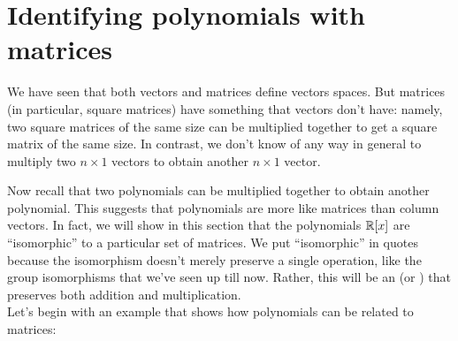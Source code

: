 \section{Identifying polynomials with matrices}\label{sec:ringIsoPolyMat}

We have seen that both vectors and matrices define vectors spaces.  But matrices (in particular, square matrices) have something that vectors don't have: namely, two square matrices of the same size can be multiplied together to get a square matrix of the same size.  In contrast, we don't know of any way in general to multiply two $n \times 1$ vectors to obtain another $n \times 1$ vector. 

Now recall that two polynomials can be multiplied together to obtain another polynomial. This suggests that polynomials are more like matrices than column vectors. In fact, we will show in this section that the polynomials $\mathbb{R}[x]$ are ``isomorphic'' to a particular set of matrices.  We put ``isomorphic'' in quotes because the isomorphism doesn't merely preserve a single operation, like the group isomorphisms  that we've seen up till now. Rather, this will be an  (or ) that preserves both addition and multiplication.\\
Let's begin with an example that shows how polynomials can be related to matrices:

